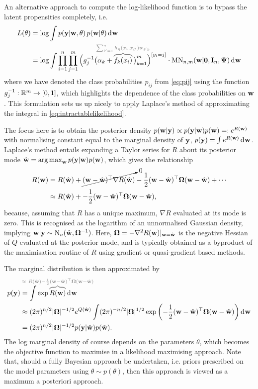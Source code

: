 An alternative approach to compute the log-likelihood function is to bypass the latent propensities completely, i.e.
\begin{align}
  L(\theta) 
  &= \log \int p(\by | \bw, \theta) \, p(\bw|\theta) \dint \bw \nonumber \\
  &= \log \int \prod_{i=1}^n \prod_{j=1}^m \Big( g_j^{-1}\big(\alpha_k + 
  \greyoverbrace{f_k(x_i)}{\hidewidth\sum_{i'=1}^n h_\eta(x_i,x_{i'})w_{i'k}\hidewidth}
  \,\big)_{k=1}^m \Big)^{[y_i=j]} \cdot \MN_{n,m}(\bw|\bzero,\bI_n, \bPsi) \dint \bw \label{eq:intractablelikelihood}
\end{align}
where we have denoted the class probabilities $p_{ij}$ from \cref{eq:pij} using the function $g_j^{-1}:\mathbb{R}^m \to [0,1]$, which highlights the dependence of the class probabilities on ${\mathbf w}$.
This formulation sets us up nicely to apply Laplace's method of approximating the integral in \cref{eq:intractablelikelihood}.

The focus here is to obtain the posterior density $p({\mathbf w}|{\mathbf y}) \propto p({\mathbf y}|{\mathbf w})p({\mathbf w}) =: e^{R({\mathbf w})}$ with normalising constant equal to the marginal density of ${\mathbf y}$, $p({\mathbf y}) = \int e^{R({\mathbf w})} \operatorname{d}\hspace{0.5pt}\! {\mathbf w}$.
Laplace's method \citep[§4.1.1, pp. 777--778]{kass1995bayes} entails expanding a Taylor series for $R$ about its posterior mode $\hat{{\mathbf w}} = \operatorname*{arg\,max}_{\mathbf w} p({\mathbf y}|{\mathbf w})p({\mathbf w})$, which gives the relationship
\begin{align*}
  R({\mathbf w}) 
  &= R(\hat{{\mathbf w}}) + 
  \cancelto{0}{({\mathbf w} - \hat{{\mathbf w}})^\top \nabla R(\hat{{\mathbf w}})} 
  - \frac{1}{2} ({\mathbf w} - \hat{{\mathbf w}})^\top {\bm\Omega} ({\mathbf w} - \hat{{\mathbf w}}) + \cdots \\
  &\approx R(\hat{{\mathbf w}}) + 
  - \frac{1}{2} ({\mathbf w} - \hat{{\mathbf w}})^\top {\bm\Omega} ({\mathbf w} - \hat{{\mathbf w}}),
\end{align*}
because, assuming that $R$ has a unique maximum, $\nabla R$ evaluated at its mode is zero.
This is recognised as the logarithm of an unnormalised Gaussian density, implying ${\mathbf w}|{\mathbf y} \sim \operatorname{N}_n(\hat{{\mathbf w}},{\bm\Omega}^{-1})$.
Here, ${\bm\Omega} = -\nabla^2 R({\mathbf w})|_{{\mathbf w}=\hat{{\mathbf w}}}$ is the negative Hessian of $Q$ evaluated at the posterior mode, and is typically obtained as a byproduct of the maximisation routine of $R$ using gradient or quasi-gradient based methods.

The marginal distribution is then approximated by
\begin{align*}
  p(\by) 
  &= \int \exp
  \greyoverbrace{R(\bw)}{\hidewidth \approx \ R(\hat\bw) - \half (\bw - \hat\bw)^\top \bOmega (\bw - \hat\bw)\hidewidth}
   \dint \bw \\
  &\approx (2\pi)^{n/2} \abs{\bOmega}^{-1/2} e^{Q(\hat\bw)} 
  \int (2\pi)^{-n/2} \abs{\bOmega}^{1/2} \exp \left(- \half (\bw - \hat\bw)^\top \bOmega (\bw - \hat\bw) \right) \dint\bw \\
  &= (2\pi)^{n/2} \abs{\bOmega}^{-1/2} p(\by|\hat\bw)p(\hat\bw).
\end{align*} 
The log marginal density of course depends on the parameters $\theta$, which becomes the objective function to maximise in a likelihood maximising approach.
Note that, should a fully Bayesian approach be undertaken, i.e. priors prescribed on the model parameters using $\theta \sim p(\theta)$, then this approach is viewed as a maximum a posteriori approach.

